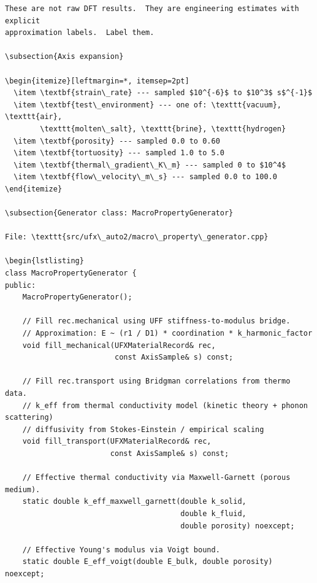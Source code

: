 \documentclass[11pt, a4paper]{article}
\begin{document}
\begin{lstlisting}[language={}]
These are not raw DFT results.  They are engineering estimates with explicit
approximation labels.  Label them.

\subsection{Axis expansion}

\begin{itemize}[leftmargin=*, itemsep=2pt]
  \item \textbf{strain\_rate} --- sampled $10^{-6}$ to $10^3$ s$^{-1}$
  \item \textbf{test\_environment} --- one of: \texttt{vacuum}, \texttt{air},
		\texttt{molten\_salt}, \texttt{brine}, \texttt{hydrogen}
  \item \textbf{porosity} --- sampled 0.0 to 0.60
  \item \textbf{tortuosity} --- sampled 1.0 to 5.0
  \item \textbf{thermal\_gradient\_K\_m} --- sampled 0 to $10^4$
  \item \textbf{flow\_velocity\_m\_s} --- sampled 0.0 to 100.0
\end{itemize}

\subsection{Generator class: MacroPropertyGenerator}

File: \texttt{src/ufx\_auto2/macro\_property\_generator.cpp}

\begin{lstlisting}
class MacroPropertyGenerator {
public:
	MacroPropertyGenerator();

	// Fill rec.mechanical using UFF stiffness-to-modulus bridge.
	// Approximation: E ~ (r1 / D1) * coordination * k_harmonic_factor
	void fill_mechanical(UFXMaterialRecord& rec,
						 const AxisSample& s) const;

	// Fill rec.transport using Bridgman correlations from thermo data.
	// k_eff from thermal conductivity model (kinetic theory + phonon scattering)
	// diffusivity from Stokes-Einstein / empirical scaling
	void fill_transport(UFXMaterialRecord& rec,
						const AxisSample& s) const;

	// Effective thermal conductivity via Maxwell-Garnett (porous medium).
	static double k_eff_maxwell_garnett(double k_solid,
										double k_fluid,
										double porosity) noexcept;

	// Effective Young's modulus via Voigt bound.
	static double E_eff_voigt(double E_bulk, double porosity) noexcept;


\end{lstlisting}
\end{document}

